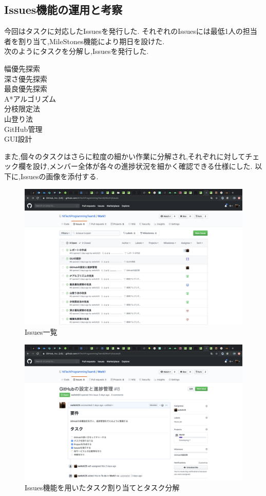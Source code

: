 \documentclass[uplatex,12pt]{jsarticle}
\begin{document}
\subsection{Issues機能の運用と考察}
今回はタスクに対応したIssuesを発行した.
それぞれのIssuesには最低1人の担当者を割り当て,MileStones機能により期日を設けた. \\
次のようにタスクを分解し,Issuesを発行した.
\begin{description}
  \item[幅優先探索]
  \item[深さ優先探索]
  \item[最良優先探索]
  \item[A*アルゴリズム]
  \item[分枝限定法]
  \item[山登り法]
  \item[GitHub管理]
  \item[GUI設計]     
\end{description}
また,個々のタスクはさらに粒度の細かい作業に分解され,それぞれに対してチェック欄を設け,メンバー全体が各々の進捗状況を細かく確認できる仕様にした.
以下に,Issuesの画像を添付する.

\begin{figure}[!hbt]
  \centering
  \includegraphics[scale=0.20]{git_image/issues_list_image.png}
  \caption{Issues一覧}
\end{figure}

\begin{figure}[!hbt]
  \centering
  \includegraphics[scale=0.20]{git_image/issues_image.png}
  \caption{Issues機能を用いたタスク割り当てとタスク分解}
\end{figure}
\end{document}
